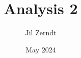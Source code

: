 \documentclass[a4paper, fontsize = 8pt, landscape]{scrartcl}
\title{Analysis 2}
\author{Jil Zerndt}
\date{May 2024}
\begin{document}
\begin{multicols}{3}
	\thispagestyle{TitlePageStyle}
	\maketitle
	
	\raggedcolumns
	
	\raggedcolumns
	\newpage
	
	\raggedcolumns
	
	\raggedcolumns
	
	\raggedcolumns
	
\end{multicols}
\end{document}
